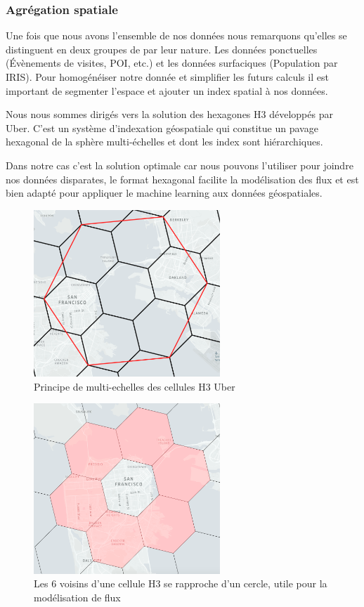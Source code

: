 \subsubsection{Agrégation spatiale}

Une fois que nous avons l'ensemble de nos données nous remarquons qu'elles se distinguent en deux groupes de par leur nature. Les données ponctuelles (\'Evènements de visites, POI, etc.) et les données surfaciques (Population par IRIS). Pour homogénéiser notre donnée et simplifier les futurs calculs il est important de segmenter l'espace et ajouter un index spatial à nos données.

Nous nous sommes dirigés vers la solution des hexagones H3 \cite{Uber_H3} développés par Uber. C'est un système d'indexation géospatiale qui constitue un pavage hexagonal de la sphère multi-échelles et dont les index sont hiérarchiques.

Dans notre cas c'est la solution optimale car nous pouvons l'utiliser pour joindre nos données disparates, le format hexagonal facilite la modélisation des flux et est bien adapté pour appliquer le machine learning aux données géospatiales.


\begin{figure}[H]
    \centering
    \includegraphics[width=7cm]{images/graphs/h3-multiscale.png}
    \caption{Principe de multi-echelles des cellules H3 Uber \cite{Uber_H3}}
    \label{fig:celluleh3}
\end{figure}

\begin{figure}[H]
    \centering
    \includegraphics[width=7cm]{images/graphs/h3-ring.png}
    \captionsetup{justification=centering}
    \caption{Les 6 voisins d'une cellule H3 se rapproche d'un cercle, utile pour la modélisation de flux \cite{Uber_H3}}
    \label{fig:celluleh3ring}
\end{figure}

